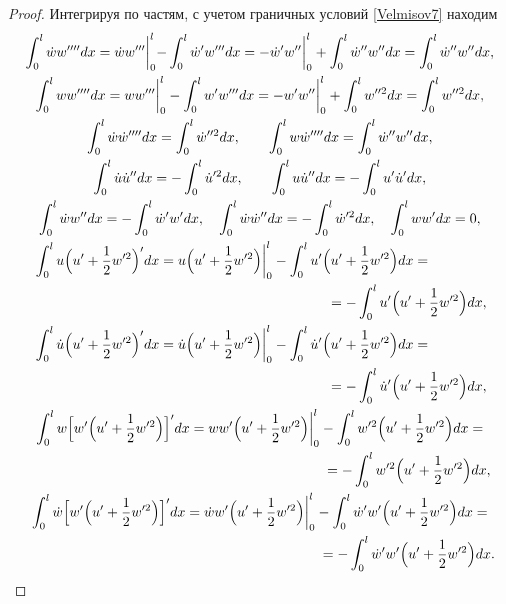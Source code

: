 \begin{proof}
 Интегрируя по частям, с учетом граничных условий \eqref{Velmisov7} находим
\begin{gather*}
\int_0^l\dot{w}w''''dx = \dot{w}w'''\biggl|_{0}^{l}-\int_{0}^{l}\dot{w}'w'''dx =- \dot{w}'w''\biggr|_{0}^{l} +\int_{0}^{l}\dot{w}''w''dx =\int_{0}^{l}\dot{w}''w''dx ,
\\
\int_{0}^{l}ww''''dx =  ww'''\biggr|_{0}^{l} -\int_{0}^{l}w'w'''dx =-  w'w''\biggr|_{0}^{l} +\int_{0}^{l}w''^{2} dx =\int_{0}^{l}w''^{2} dx ,
\\
\int_{0}^{l}\dot{w}\dot{w}''''dx =\int_{0}^{l}\dot{w}''^{2} dx ,\qquad \int _{0}^{l}w\dot{w}''''dx =\int_{0}^{l}\dot{w}''w''dx ,\\
\int_{0}^{l}\dot{u}\dot{u}''dx =-\int_{0}^{l}\dot{u}'^{2} dx , \qquad \int_{0}^{l}u\dot{u}''dx =-\int_{0}^{l}u'\dot{u}'dx ,\\ 
\int_{0}^{l}\dot{w}w''dx =-\int_{0}^{l}\dot{w}'w'dx ,\quad  \int_{0}^{l}\dot{w}\dot{w}''dx =-\int_{0}^{l}\dot{w}'^{2} dx , \quad 
\int_{0}^{l}ww'dx =0,
\\
\int_{0}^{l}u \Bigl(u'+\frac{1}{2} w'^{2} \Bigr)' dx = u\Bigl(u' +\frac{1}{2} w'^{2} \Bigr)\biggr|_{0}^{l} 
-\int_{0}^{l}u'\Bigl(u'+\frac{1}{2} w'^{2} \Bigr)dx = \hspace{1.4cm}
\\ \hspace{7.5cm} = -\int_{0}^{l}u'\Bigl(u'+\frac{1}{2} w'^{2} \Bigr)dx , 
\\
\int_{0}^{l}\dot{u}
\Bigl(u'+\frac{1}{2} w'^{2} \Bigr)' dx = \dot{u}\Bigl(u'+\frac{1}{2} w'^{2} \Bigr)\biggr|_{0}^{l} -
\int_{0}^{l}\dot{u}'
\Bigl(u'+\frac{1}{2} w'^{2} \Bigr)dx =
\hspace{1.4cm}
\\ 
\hspace{7.5cm} 
=-\int_{0}^{l}\dot{u}'
\Bigl(u'+\frac{1}{2} w'^{2} \Bigr)dx ,
\\
\int_{0}^{l}w
\Bigl[w'\Bigl(u'+\frac{1}{2} w'^{2} \Bigr)\Bigr]' dx = ww'\Bigl(u'+\frac{1}{2} w'^{2} \Bigr)\biggr|_{0}^{l} -\int_{0}^{l}w'^{2} \Bigl(u'+\frac{1}{2} w'^{2} \Bigr)dx =
\\
\hspace{7.5cm} 
=-\int_{0}^{l}w'^{2} \Bigl(u'+\frac{1}{2} w'^{2} \Bigr)dx ,
\\
\int_{0}^{l}\dot{w}
\Bigl[w'\Bigl(u'+\frac{1}{2} w'^{2} \Bigr)\Bigr]' dx = \dot{w}w'\Bigl(u'+\frac{1}{2} w'^{2} \Bigr)\biggr|_{0}^{l} -\int_{0}^{l}\dot{w}'w'\Bigl(u'+\frac{1}{2} w'^{2} \Bigr)dx =\\
\hspace{7.5cm} 
 =-\int_{0}^{l}\dot{w}'w'\Bigl(u'+\frac{1}{2} w'^{2} \Bigr)dx .
\end{gather*}


\end{proof}
